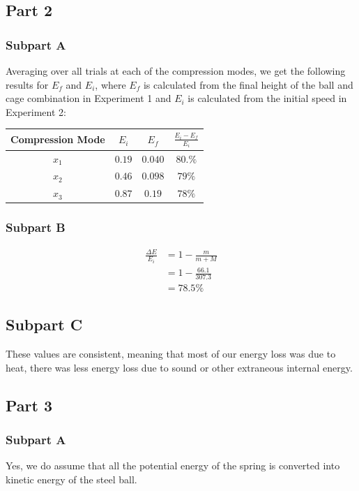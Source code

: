 \documentclass[8pt]{extarticle}
\begin{document}
{\subsection*{Part 2}
\subsubsection*{Subpart A}
Averaging over all trials at each of the compression modes, we get the following results for $E_f$ and $E_i$, where $E_{f}$ is calculated from the final height of the ball and cage combination in Experiment 1 and $E_i$ is calculated from the initial speed in Experiment 2:
\begin{center}
	\begin{tabular}{c|c|c|c}
		Compression Mode & $E_{i}$ & $E_{f}$ & $\frac{E_{i}-E_{f}}{E_{i}}$ \\
		\hline
		$x_1$ & $0.19$ & $0.040$ & $80.\%$\\
		$x_2$ & $0.46$ & $0.098$ & $79\%$ \\
		$x_3$ & $0.87$ & $0.19$ & $78\%$
	\end{tabular}
\end{center}
\subsubsection*{Subpart B}
\begin{align*}
	\frac{\Delta E}{E_{i}} &= 1 - \frac{m}{m+M} \\
	&= 1 - \frac{66.1}{307.3} \\
	&= 78.5\%
\end{align*}
\subsection*{Subpart C}
These values are consistent, meaning that most of our energy loss was due to heat, there was less energy loss due to sound or other extraneous internal energy.
\subsection*{Part 3}
\subsubsection*{Subpart A}
Yes, we do assume that all the potential energy of the spring is converted into kinetic energy of the steel ball.
}
\end{document}
